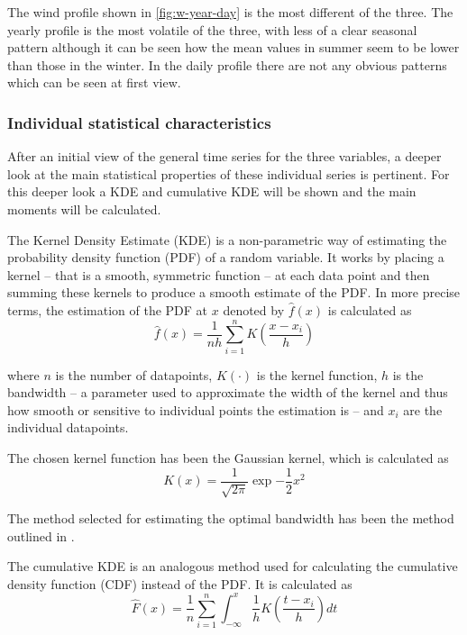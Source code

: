 The wind profile shown in \autoref{fig:w-year-day} is the most different of the three. The yearly profile is the most volatile of the three, with less of a clear seasonal pattern although it can be seen how the mean values in summer seem to be lower than those in the winter. In the daily profile there are not any obvious patterns which can be seen at first view. 

\subsubsection{Individual statistical characteristics}
After an initial view of the general time series for the three variables, a deeper look at the main statistical properties of these individual series is pertinent. For this deeper look a KDE and cumulative KDE will be shown and the main moments will be calculated. 

The Kernel Density Estimate (KDE) is a non-parametric way of estimating the probability density function (PDF) of a random variable. It works by placing a kernel -- that is a smooth, symmetric function -- at each data point and then summing these kernels to produce a smooth estimate of the PDF. In more precise terms, the estimation of the PDF at $x$ denoted by $\hat{f}\left(x\right)$ is calculated as
\begin{equation}
    \hat{f}\left(x\right)=\frac{1}{nh}\sum^n_{i=1}K\left(\frac{x-x_i}{h}\right)
\end{equation}

where $n$ is the number of datapoints, $K\left(\cdot\right)$ is the kernel function, $h$ is the bandwidth -- a parameter used to approximate the width of the kernel and thus how smooth or sensitive to individual points the estimation is -- and $x_i$ are the individual datapoints.

The chosen kernel function has been the Gaussian kernel, which is calculated as 
\begin{equation}
    K\left(x\right)=\frac{1}{\sqrt{2\pi}}\exp{-\frac{1}{2}x^2}
\end{equation}

The method selected for estimating the optimal bandwidth has been the method outlined in \cite{scott_1979}. 

The cumulative KDE is an analogous method used for calculating the cumulative density function (CDF) instead of the PDF. It is calculated as
\begin{equation}
    \hat{F}\left(x\right)=\frac{1}{n}\sum^n_{i=1}\int_{-\infty}^{x}\frac{1}{h}K\left(\frac{t-x_i}{h}\right)dt
\end{equation}

